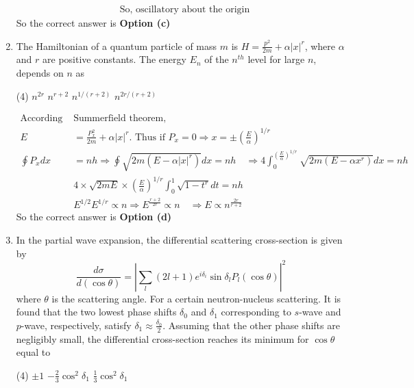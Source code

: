 \begin{enumerate}
\begin{answer}
\begin{align*}
&\text{So, oscillatory about the origin}
	\end{align*}
		So the correct answer is \textbf{Option (c)}
\end{answer}
\item  The Hamiltonian of a quantum particle of mass $m$ is $H=\frac{p^{2}}{2 m}+\alpha|x|^{r}$, where $\alpha$ and $r$ are positive constants. The energy $E_{n}$ of the $n^{t h}$ level for large $n$, depends on $n$ as
 \begin{tasks}(4)
	\task[\textbf{a.}]$n^{2 r}$
	\task[\textbf{b.}]$n^{r+2}$
	\task[\textbf{c.}]$n^{1 /(r+2)}$
	\task[\textbf{d.}] $n^{2 r /(r+2)}$
\end{tasks}
\begin{answer}
	\begin{align*}
	\text{According to Bohr }&\text{Summerfield theorem,}\\
	E&=\frac{P_{x}^{2}}{2 m}+\alpha|x|^{r} \text {. Thus if } P_{x}=0 \Rightarrow x=\pm\left(\frac{E}{\alpha}\right)^{1 / r}\\
	\oint P_{x} d x&=n h \Rightarrow \oint \sqrt{2 m\left(E-\alpha|x|^{r}\right)} d x=n h \quad \Rightarrow 4 \int_{0}^{\left(\frac{E}{\alpha}\right)^{1 / r}} \sqrt{2 m\left(E-\alpha x^{r}\right)} d x=n h\\
	&4 \times \sqrt{2 m E} \times\left(\frac{E}{\alpha}\right)^{1 / r} \int_{0}^{1} \sqrt{1-t^{r}} d t=n h\\
	&E^{1 / 2} E^{1 / r} \propto n \Rightarrow E^{\frac{r+2}{2 r}} \propto n \quad \Rightarrow E \propto n^{\frac{2 r}{r+2}}
	\end{align*}
	So the correct answer is \textbf{Option (d)}
\end{answer}
\item In the partial wave expansion, the differential scattering cross-section is given by
$$
\frac{d \sigma}{d(\cos \theta)}=\left|\sum_{l}(2 l+1) e^{i \delta_{i}} \sin \delta_{l} P_{l}(\cos \theta)\right|^{2}
$$
where $\theta$ is the scattering angle. For a certain neutron-nucleus scattering. It is found that the two lowest phase shifts $\delta_{0}$ and $\delta_{1}$ corresponding to $s$-wave and $p$-wave, respectively, satisfy $\delta_{1} \approx \frac{\delta_{0}}{2}$. Assuming that the other phase shifts are negligibly small, the differential cross-section reaches its minimum for $\cos \theta$ equal to
 \begin{tasks}(4)
	\task[\textbf{b.}] $\pm 1$
	\task[\textbf{c.}]$-\frac{2}{3} \cos ^{2} \delta_{1}$
	\task[\textbf{d.}]  $\frac{1}{3} \cos ^{2} \delta_{1}$

\end{tasks}
\end{enumerate}
